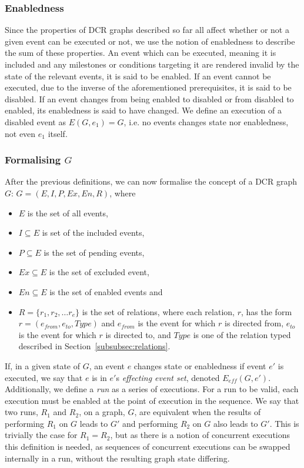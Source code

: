 \documentclass{article}
\begin{document}
			\subsubsection{Enabledness}

			Since the properties of DCR graphs described so far all affect whether or not a given event can be executed or not, we use the notion of enabledness to describe the sum of these properties.
			An event which can be executed, meaning it is included and any milestones or conditions targeting it are rendered invalid by the state of the relevant events, it is said to be enabled.
			If an event cannot be executed, due to the inverse of the aforementioned prerequisites, it is said to be disabled.
			If an event changes from being enabled to disabled or from disabled to enabled, its enabledness is said to have changed.
			We define an execution of a disabled event as $E(G,e_1) = G$, i.e. no events changes state nor enabledness, not even $e_1$ itself.

			\subsubsection{Formalising \texorpdfstring{$G$}{}}
			\label{subsubsec:formalising-g}

			After the previous definitions, we can now formalise the concept of a DCR graph $G$:
			$G = (E, I, P, Ex, En, R)$, where
			\begin{itemize}
				\item $E$ is the set of all events,
				\item $I \subseteq E$ is set of the included events,
				\item $P \subseteq E$ is the set of pending events,
				\item $Ex \subseteq E$ is the set of excluded event,
				\item $En \subseteq E$ is the set of enabled events and
				\item $R = \{r_1, r_2, \dots r_e\}$ is the set of relations, where each relation, $r$, has the form $r=(e_{from}, e_{to}, Type)$ and $e_{from}$ is the event for which $r$ is directed from, $e_{to}$ is the event for which $r$ is directed to, and $Type$ is one of the relation typed described in Section~\ref{subsubsec:relations}.
			\end{itemize}

			If, in a given state of $G$, an event $e$ changes state or enabledness if event $e'$ is executed, we say that $e$ is in $e'$s \textit{effecting event set}, denoted $E_{eff}(G,e')$.
			Additionally, we define a \textit{run} as a series of executions.
			For a run to be valid, each execution must be enabled at the point of execution in the sequence.
            We say that two runs, $R_1$ and $R_2$, on a graph, $G$, are equivalent when the results of performing $R_1$ on $G$ leads to $G'$ and performing $R_2$ on $G$ also leads to $G'$.
            This is trivially the case for $R_1 = R_2$, but as there is a notion of concurrent executions this definition is needed, as sequences of concurrent executions can be swapped internally in a run, without the resulting graph state differing.
\end{document}
